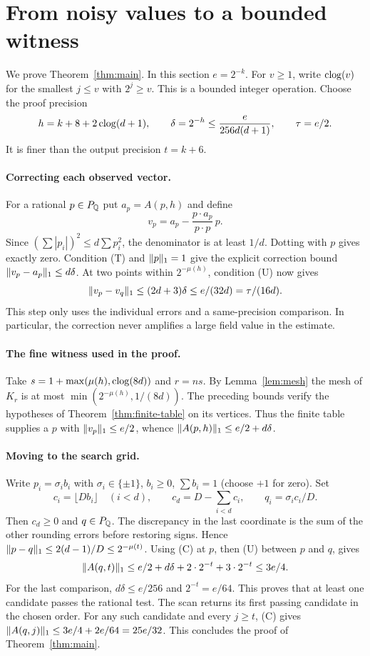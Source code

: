 \section{From noisy values to a bounded witness}\label{sec:search}
We prove Theorem~\ref{thm:main}. In this section $e=2^{-k}$.
For $v\ge1$, write $\operatorname{clog}(v)$ for the smallest $j\le v$ with $2^j\ge v$.
This is a bounded integer operation. Choose the proof precision
\[
 h=k+8+2\operatorname{clog}(d+1),\qquad \delta=2^{-h}
       \le\frac{e}{256d(d+1)},\qquad \tau=e/2 .
\]
It is finer than the output precision $t=k+6$.

\paragraph{Correcting each observed vector.}
For a rational $p\in P_\mathbb Q$ put $a_p=A(p,h)$ and define
\[
 v_p=a_p-\frac{p\cdot a_p}{p\cdot p}\,p .
\]
Since $(\sum |p_i|)^2\le d\sum p_i^2$, the denominator is at least
$1/d$. Dotting with $p$ gives exactly zero. Condition (T) and
$\lVert p\rVert_1=1$ give the explicit correction bound $\lVert v_p-a_p\rVert_1\le d\delta$.
At two points within $2^{-\mu(h)}$, condition (U) now gives
\[
 \lVert v_p-v_q\rVert_1\le(2d+3)\delta\le e/(32d)=\tau/(16d).
\]
This step only uses the individual errors and a same-precision
comparison. In particular, the correction never amplifies a large
field value in the estimate.

\paragraph{The fine witness used in the proof.}
Take $s=1+\max(\mu(h),\operatorname{clog}(8d))$ and $r=ns$. By
Lemma~\ref{lem:mesh} the mesh of $K_r$ is at most
$\min(2^{-\mu(h)},1/(8d))$. The preceding bounds verify the hypotheses
of Theorem~\ref{thm:finite-table} on its vertices. Thus the finite
table supplies a $p$ with $\lVert v_p\rVert_1\le e/2$, whence
$\lVert A(p,h)\rVert_1\le e/2+d\delta$.

\paragraph{Moving to the search grid.}
Write $p_i=\sigma_i b_i$ with $\sigma_i\in\{\pm1\}$, $b_i\ge0$,
$\sum b_i=1$ (choose $+1$ for zero). Set
\[
 c_i=\lfloor Db_i\rfloor\quad(i<d),\qquad
 c_d=D-\sum_{i<d}c_i,\qquad q_i=\sigma_i c_i/D .
\]
Then $c_d\ge0$ and $q\in P_\mathbb Q$. The discrepancy in the last
coordinate is the sum of the other rounding errors before restoring
signs. Hence $\lVert p-q\rVert_1\le2(d-1)/D\le2^{-\mu(t)}$.
Using (C) at $p$, then (U) between $p$ and $q$, gives
\[
 \lVert A(q,t)\rVert_1
 \le e/2+d\delta+2\cdot2^{-t}+3\cdot2^{-t}
 \le 3e/4 .
\]
For the last comparison, $d\delta\le e/256$ and $2^{-t}=e/64$.
This proves that at least one candidate passes the rational test.
The scan returns its first passing candidate in the chosen order.
For any such candidate and every $j\ge t$, (C) gives
$\lVert A(q,j)\rVert_1\le 3e/4+2e/64=25e/32$.
This concludes the proof of Theorem~\ref{thm:main}.

